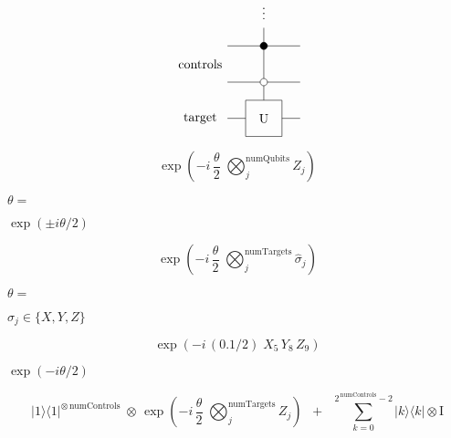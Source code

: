\documentclass{article}
\begin{document}
\[
             \begin{tikzpicture}[scale=.5]
             \node[draw=none] at (-3.5, 3) {controls};
             \node[draw=none] at (-3.5, 0) {target};

             \node[draw=none] at (0, 6) {$\vdots$};
             \draw (0, 5) -- (0, 4);
             
             \draw (-2, 4) -- (2, 4);
             \draw[fill=black] (0, 4) circle (.2);
             \draw (0, 4) -- (0, 2);         
             
             \draw (-2, 2) -- (2, 2);
             \draw[fill=white] (0, 2) circle (.2);
             \draw (0, 2-.2) -- (0, 1);
             
             \draw (-2,0) -- (-1, 0);
             \draw (1, 0) -- (2, 0);
             \draw (-1,-1)--(-1,1)--(1,1)--(1,-1)--cycle;
             \node[draw=none] at (0, 0) {U};
             \end{tikzpicture}
 \]
\pagebreak

\[ 
   \exp \left( - i \, \frac{\theta}{2} \; \bigotimes_{j}^{\text{numQubits}} Z_j\right)
\]
\pagebreak

$\theta =$
\pagebreak

$\exp(\pm i \theta/2)$
\pagebreak

\[ 
   \exp \left( - i \, \frac{\theta}{2} \; \bigotimes_{j}^{\text{numTargets}} \hat{\sigma}_j\right)
\]
\pagebreak

$\theta = $
\pagebreak

$\hat{\sigma}_j \in \{X, Y, Z\}$
\pagebreak

\[
   \exp \left( - i \, (0.1/2) \; X_5 \, Y_8 \, Z_9 \right) 
\]
\pagebreak

$\exp(-i \theta/2)$
\pagebreak

\[ 
   |1\rangle\langle 1|^{\otimes\, \text{numControls}} \; \otimes \,
    \exp \left( - i \, \frac{\theta}{2} \; \bigotimes_{j}^{\text{numTargets}} Z_j\right)
    \;\;+\;\; \sum\limits_{k=0}^{2^{\,\text{numControls}} - 2} |k\rangle\langle k| \otimes \text{I}
\]
\pagebreak
\end{document}

